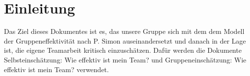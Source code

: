 
\chapter{Einleitung}

Das Ziel dieses Dokumentes ist es, das unsere Gruppe sich mit dem dem Modell der Gruppeneffektivität nach P. Simon \cite{simon2002entwicklung} \citep{stumpf2003teamarbeit} auseinandersetzt und danach in der Lage ist, die eigene Teamarbeit kritisch einzuschätzen. Dafür werden die Dokumente Selbsteinschätzung: Wie effektiv ist mein Team? und Gruppeneinschätzung: Wie effektiv ist mein Team? verwendet. 

